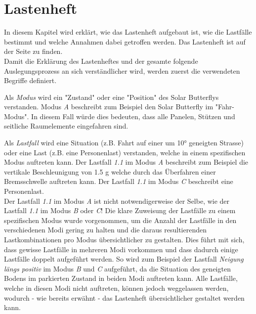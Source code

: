 \section{Lastenheft}
\label{Lastenheft}
In diesem Kapitel wird erklärt, wie das Lastenheft aufgebaut ist, wie die Lastfälle bestimmt und welche Annahmen dabei getroffen werden. Das Lastenheft ist auf der Seite \pageref{Lastenheft A} zu finden.\\

Damit die Erklärung des Lastenheftes und der gesamte folgende Auslegungsprozess an sich verständlicher wird, werden zuerst die verwendeten Begriffe definiert.

Als \emph{Modus} wird ein "Zustand" oder eine "Position" des Solar Butterflys verstanden. Modus \emph{A} beschreibt zum Beispiel den Solar Butterfly im "Fahr-Modus". In diesem Fall würde dies bedeuten, dass alle Panelen, Stützen und seitliche Raumelemente eingefahren sind.

Als \emph{Lastfall} wird eine Situation (z.B. Fahrt auf einer um 10° geneigten Strasse) oder eine Last (z.B. eine Personenlast) verstanden, welche in einem spezifischen Modus auftreten kann. Der Lastfall \emph{1.1} im Modus \emph{A} beschreibt zum Beispiel die vertikale Beschleunigung von 1.5 g welche durch das Überfahren einer Bremsschwelle auftreten kann. Der Lastfall \emph{1.1} im Modus \emph{C} beschreibt eine Personenlast.\\
Der Lastfall \emph{1.1} im Modus \emph{A} ist nicht notwendigerweise der Selbe, wie der Lastfall \emph{1.1} im Modus \emph{B} oder \emph{C}! Die klare Zuweisung der Lastfälle zu einem spezifischen Modus wurde vorgenommen, um die Anzahl der Lastfälle in den verschiedenen Modi gering zu halten und die daraus resultierenden Lastkombinationen pro Modus übersichtlicher zu gestalten. Dies führt mit sich, dass gewisse Lastfälle in mehreren Modi vorkommen und dass dadurch einige Lastfälle doppelt aufgeführt werden. So wird zum Beispiel der Lastfall \emph{Neigung längs positiv} im Modus \emph{B} und \emph{C} aufgeführt, da die Situation des geneigten Bodens im parkierten Zustand in beiden Modi auftreten kann. Alle Lastfälle, welche in diesen Modi nicht auftreten, können jedoch weggelassen werden, wodurch - wie bereits erwähnt - das Lastenheft übersichtlicher gestaltet werden kann.

